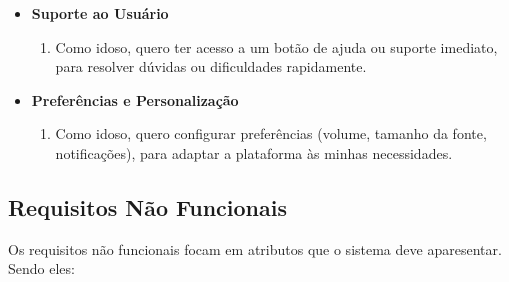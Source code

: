 \begin{itemize}
    \item \textbf{Suporte ao Usuário}
        \begin{enumerate}
            \item [US21] Como idoso, quero ter acesso a um botão de ajuda ou suporte imediato, para resolver dúvidas ou dificuldades rapidamente.
        \end{enumerate}
 
    \item \textbf{Preferências e Personalização}
        \begin{enumerate}
            \item [US22] Como idoso, quero configurar preferências (volume, tamanho da fonte, notificações), para adaptar a plataforma às minhas necessidades.
        \end{enumerate}
\end{itemize}

\subsection{Requisitos Não Funcionais}
Os requisitos não funcionais focam em atributos que o sistema deve aparesentar. Sendo eles:

